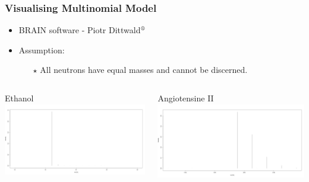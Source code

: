 \documentclass[xetex]{beamer}
\begin{document}
	\begin{frame}\frametitle{Visualising Multinomial Model}

		\begin{itemize}
			\item BRAIN software - Piotr Dittwald$^\text{\textregistered}$
			\item Assumption: 
			\begin{itemize}
				\item[$\star$]All neutrons have equal masses and cannot be discerned. 
			\end{itemize}
		\end{itemize}

		\begin{columns}
			\begin{column}[t]{.5\textwidth}
				\begin{center}
					Ethanol 
					\includegraphics[height=.3\textheight, keepaspectratio]{./picts/ethanol.png}
				\end{center}
			\end{column}
			\begin{column}[t]{.5\textwidth}
				\begin{center}
					Angiotensine II
					\includegraphics[height=.3\textheight, keepaspectratio]{./picts/angiotensine.png}		
				\end{center}
			\end{column}
		\end{columns}	


\end{frame}
\end{document}
